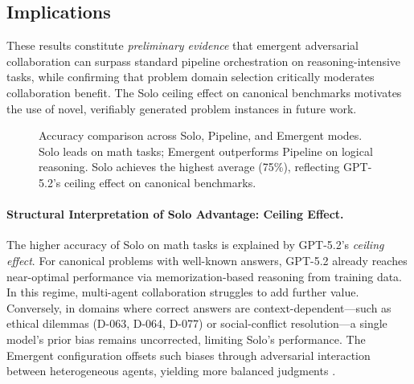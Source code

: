 \documentclass[12pt]{article}
\begin{document}
\subsection*{Implications}

These results constitute \emph{preliminary evidence} that emergent adversarial
collaboration can surpass standard pipeline orchestration on reasoning-intensive
tasks, while confirming that problem domain selection critically moderates
collaboration benefit. The Solo ceiling effect on canonical benchmarks motivates
the use of novel, verifiably generated problem instances in future work.

\begin{figure}[htbp]
\centering
{}
\caption{Accuracy comparison across Solo, Pipeline, and Emergent modes. Solo leads on math tasks; Emergent outperforms Pipeline on logical reasoning. Solo achieves the highest average (75\%), reflecting GPT-5.2's ceiling effect on canonical benchmarks.}
\label{fig:solo-pipeline-emergent}
\end{figure}

\paragraph{Structural Interpretation of Solo Advantage: Ceiling Effect.}
The higher accuracy of Solo on math tasks is explained by GPT-5.2's \emph{ceiling effect}. For canonical problems with well-known answers, GPT-5.2 already reaches near-optimal performance via memorization-based reasoning from training data. In this regime, multi-agent collaboration struggles to add further value. Conversely, in domains where correct answers are context-dependent---such as ethical dilemmas (D-063, D-064, D-077) or social-conflict resolution---a single model's prior bias remains uncorrected, limiting Solo's performance. The Emergent configuration offsets such biases through adversarial interaction between heterogeneous agents, yielding more balanced judgments \cite{du2023debate}.
\end{document}
